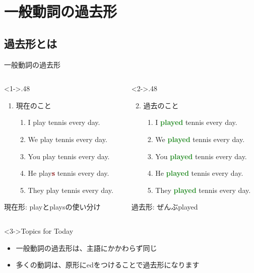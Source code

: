 \documentclass[aspectratio=169,xcolor={dvipsnames,table}]{beamer}
\newcommand{\myaudio}[1]{\href{#1}{\faVolumeUp}}
\begin{document}
\section{一般動詞の過去形}

\subsection{過去形とは}
\begin{frame}[plain]{一般動詞の過去形}
 \Large

\begin{columns}
\begin{column}<1->{.48\textwidth}
\begin{enumerate}
 \item 現在のこと
       \begin{enumerate}
	\item I play tennis every day.
	\item We play tennis every day.
	\item You play tennis every day.
	\item He play\textcolor{Maroon}{\bfseries s} tennis every day.
	\item They play tennis every day.
       \end{enumerate}
\end{enumerate}

{\small 現在形: playとplaysの使い分け}
\end{column}
\begin{column}<2->{.48\textwidth}
\begin{enumerate}
\setcounter{enumi}{1} \item 過去のこと
        \begin{enumerate}
	\item I \textcolor{ForestGreen}{\bfseries played} tennis every day.
	\item We \textcolor{ForestGreen}{\bfseries played} tennis every day.
	\item You \textcolor{ForestGreen}{\bfseries played} tennis every day.
	\item He \textcolor{ForestGreen}{\bfseries played} tennis every day.
	\item They \textcolor{ForestGreen}{\bfseries played} tennis every day.
       \end{enumerate}
\end{enumerate}

{\small 過去形: ぜんぶplayed}
\end{column}
\end{columns}

\begin{block}<3->{Topics for Today}\small
\begin{itemize}[square]
 \item 一般動詞の過去形は、主語にかかわらず同じ
 \item 多くの動詞は、原形にedをつけることで過去形になります
\end{itemize}
\end{block}

\hfill\myaudio{./audio/025_past_do_01.mp3}
\end{frame}
\end{document}
